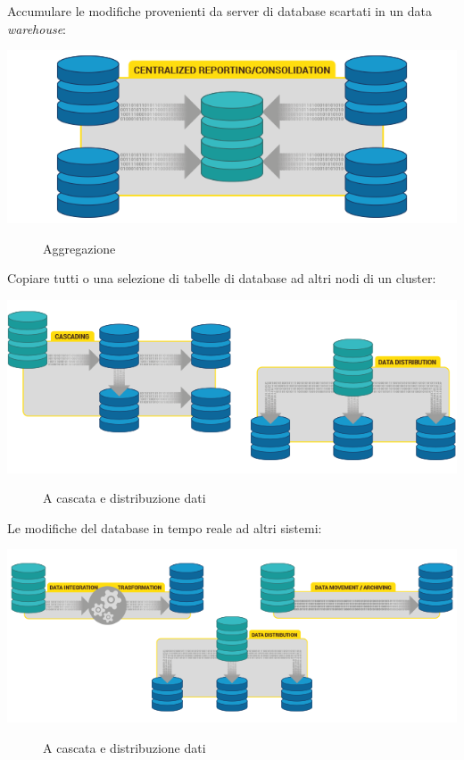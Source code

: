 Accumulare le modifiche provenienti da server di database scartati in un data \textit{warehouse}:

\begin{center}
\includegraphics[scale=0.60]{img/pglogical_2.png}\\
\end{center}
\begin{figure}[htbp]
\caption{Aggregazione \label{figura2} \cite{etichetta3}}
\end{figure}

Copiare tutti o una selezione di tabelle di database ad altri nodi di un cluster:

\begin{center}
\includegraphics[scale=0.60]{img/pglogical_3.png}\\
\end{center}
\begin{figure}[htbp]
\caption{A cascata e distribuzione dati \label{figura3} \cite{etichetta3}}
\end{figure}

Le modifiche del database in tempo reale ad altri sistemi:

\begin{center}
\includegraphics[scale=0.60]{img/pglogical_4.png}\\
\end{center}
\begin{figure}[htbp]
\caption{A cascata e distribuzione dati \label{figura4} \cite{etichetta3}}
\end{figure}


